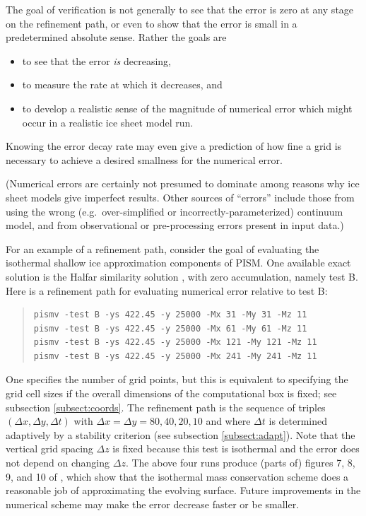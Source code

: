 \documentclass[11pt,final]{amsart}
\begin{document}
The goal of verification is not generally to see that the error is zero at any stage on the refinement path, or even to show that the error is small in a predetermined absolute sense.  Rather the goals are
\begin{itemize}
\item to see that the error \emph{is} decreasing,
\item to measure the rate at which it decreases, and
\item to develop a realistic sense of the magnitude of numerical error which might occur in a realistic ice sheet model run.
\end{itemize}
Knowing the error decay rate may even give a prediction of how fine a grid is necessary to achieve a desired smallness for the numerical error.

(Numerical errors are certainly not presumed to dominate among reasons why ice sheet models give imperfect results.  Other sources of ``errors'' include those from using the wrong (e.g.~over-simplified or incorrectly-parameterized) continuum model, and from observational or pre-processing errors present in input data.)

For an example of a refinement path, consider the goal of evaluating the isothermal shallow ice approximation components of PISM.  One available exact solution is the Halfar similarity solution \cite{Halfar83}, with zero accumulation, namely test B.  Here is a refinement path for evaluating numerical error relative to test B:
\begin{quote}\small
\begin{verbatim}
pismv -test B -ys 422.45 -y 25000 -Mx 31 -My 31 -Mz 11
pismv -test B -ys 422.45 -y 25000 -Mx 61 -My 61 -Mz 11
pismv -test B -ys 422.45 -y 25000 -Mx 121 -My 121 -Mz 11
pismv -test B -ys 422.45 -y 25000 -Mx 241 -My 241 -Mz 11
\end{verbatim}
\normalsize\end{quote}
One specifies the number of grid points, but this is equivalent to specifying the grid cell sizes if the overall dimensions of the computational box is fixed; see subsection \ref{subsect:coords}.  The refinement path is the sequence of triples $(\Delta x,\Delta y,\Delta t)$ with $\Delta x = \Delta y = 80,40,20,10$ and where $\Delta t$ is determined adaptively by a stability criterion (see subsection \ref{subsect:adapt}).  Note that the vertical grid spacing $\Delta z$ is fixed because this test is isothermal and the error does not depend on changing $\Delta z$.  The above four runs produce (parts of) figures 7, 8, 9, and 10 of \cite{BLKCB}, which show that the isothermal mass conservation scheme does a reasonable job of approximating the evolving surface.  Future improvements in the numerical scheme may make the error decrease faster or be smaller.
\end{document}
